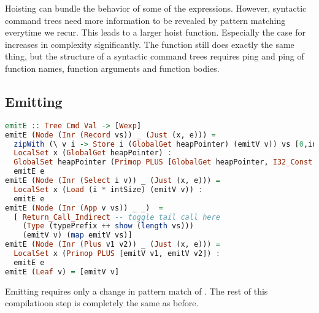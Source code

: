 Hoisting can bundle the behavior of some of the  expressions. However, syntactic command trees need more information to be revealed by pattern matching everytime we recur. This leads to a larger hoist function. Especially the case for  increases in complexity significantly. The function still does exactly the same thing, but the structure of a syntactic command trees requires ping and ping of function names, function arguments and function bodies.

\subsection{\label{subsection:emit2}Emitting}
\begin{lstlisting}[language=Haskell]
emitE :: Tree Cmd Val -> [Wexp]
emitE (Node (Inr (Record vs)) _ (Just (x, e))) =
  zipWith (\ v i -> Store i (GlobalGet heapPointer) (emitV v)) vs [0,intSize..] ++
  LocalSet x (GlobalGet heapPointer) :
  GlobalSet heapPointer (Primop PLUS [GlobalGet heapPointer, I32_Const (length vs * intSize)]) :
  emitE e
emitE (Node (Inr (Select i v)) _ (Just (x, e))) =
  LocalSet x (Load (i * intSize) (emitV v)) :
  emitE e
emitE (Node (Inr (App v vs)) _ _)  =
  [ Return_Call_Indirect -- toggle tail call here
    (Type (typePrefix ++ show (length vs)))
    (emitV v) (map emitV vs)]
emitE (Node (Inr (Plus v1 v2)) _ (Just (x, e))) =
  LocalSet x (Primop PLUS [emitV v1, emitV v2]) :
  emitE e
emitE (Leaf v) = [emitV v]
\end{lstlisting}

Emitting requires only a change in pattern match of . The rest of this compilatioon step is completely the same as before.